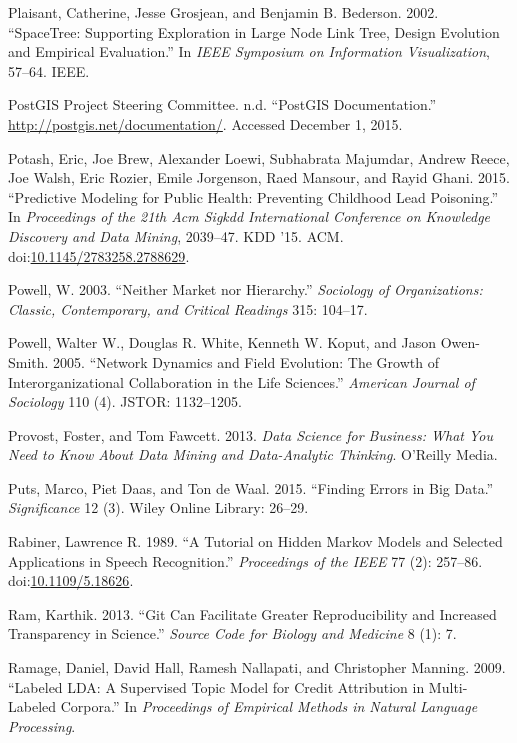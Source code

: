 \documentclass[]{krantz}
\begin{document}
\hypertarget{ref-plaisant2002spacetree}{}
Plaisant, Catherine, Jesse Grosjean, and Benjamin B. Bederson. 2002.
``SpaceTree: Supporting Exploration in Large Node Link Tree, Design
Evolution and Empirical Evaluation.'' In \emph{IEEE Symposium on
Information Visualization}, 57--64. IEEE.

\hypertarget{ref-PostGISdoc}{}
PostGIS Project Steering Committee. n.d. ``PostGIS Documentation.''
\url{http://postgis.net/documentation/}. Accessed December 1, 2015.

\hypertarget{ref-Potash2015}{}
Potash, Eric, Joe Brew, Alexander Loewi, Subhabrata Majumdar, Andrew
Reece, Joe Walsh, Eric Rozier, Emile Jorgenson, Raed Mansour, and Rayid
Ghani. 2015. ``Predictive Modeling for Public Health: Preventing
Childhood Lead Poisoning.'' In \emph{Proceedings of the 21th Acm Sigkdd
International Conference on Knowledge Discovery and Data Mining},
2039--47. KDD '15. ACM.
doi:\href{https://doi.org/10.1145/2783258.2788629}{10.1145/2783258.2788629}.

\hypertarget{ref-powell2003neither}{}
Powell, W. 2003. ``Neither Market nor Hierarchy.'' \emph{Sociology of
Organizations: Classic, Contemporary, and Critical Readings} 315:
104--17.

\hypertarget{ref-powell2005network}{}
Powell, Walter W., Douglas R. White, Kenneth W. Koput, and Jason
Owen-Smith. 2005. ``Network Dynamics and Field Evolution: The Growth of
Interorganizational Collaboration in the Life Sciences.'' \emph{American
Journal of Sociology} 110 (4). JSTOR: 1132--1205.

\hypertarget{ref-FawcettProvost}{}
Provost, Foster, and Tom Fawcett. 2013. \emph{Data Science for Business:
What You Need to Know About Data Mining and Data-Analytic Thinking}.
O'Reilly Media.

\hypertarget{ref-puts2015finding}{}
Puts, Marco, Piet Daas, and Ton de Waal. 2015. ``Finding Errors in Big
Data.'' \emph{Significance} 12 (3). Wiley Online Library: 26--29.

\hypertarget{ref-rabiner-89}{}
Rabiner, Lawrence R. 1989. ``A Tutorial on Hidden Markov Models and
Selected Applications in Speech Recognition.'' \emph{Proceedings of the
IEEE} 77 (2): 257--86.
doi:\href{https://doi.org/10.1109/5.18626}{10.1109/5.18626}.

\hypertarget{ref-ram2013git}{}
Ram, Karthik. 2013. ``Git Can Facilitate Greater Reproducibility and
Increased Transparency in Science.'' \emph{Source Code for Biology and
Medicine} 8 (1): 7.

\hypertarget{ref-ramage-09}{}
Ramage, Daniel, David Hall, Ramesh Nallapati, and Christopher Manning.
2009. ``Labeled LDA: A Supervised Topic Model for Credit Attribution in
Multi-Labeled Corpora.'' In \emph{Proceedings of Empirical Methods in
Natural Language Processing}.
\end{document}
